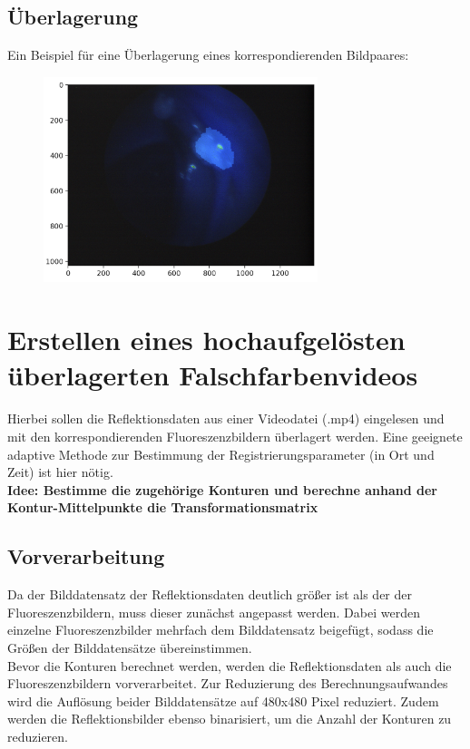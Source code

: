 \documentclass[conference]{IEEEtran}
\begin{document}
\subsection{Überlagerung}

Ein Beispiel für eine Überlagerung eines korrespondierenden Bildpaares:

\begin{figure}[h]
\includegraphics[width=8cm]{Fig2}
\end{figure}

\section{Erstellen eines hochaufgelösten überlagerten Falschfarbenvideos} 

Hierbei sollen die Reflektionsdaten aus einer Videodatei (.mp4) eingelesen und mit den korrespondierenden Fluoreszenzbildern überlagert werden. Eine geeignete adaptive Methode zur Bestimmung der Registrierungsparameter (in Ort und Zeit) ist hier nötig. \\

\textbf{Idee: Bestimme die zugehörige Konturen und berechne anhand der Kontur-Mittelpunkte die Transformationsmatrix} \\

\subsection{Vorverarbeitung}

Da der Bilddatensatz der Reflektionsdaten deutlich größer ist als der der Fluoreszenzbildern, muss dieser zunächst angepasst werden. Dabei werden einzelne Fluoreszenzbilder mehrfach dem Bilddatensatz beigefügt, sodass die Größen der Bilddatensätze übereinstimmen. \\

Bevor die Konturen berechnet werden, werden die Reflektionsdaten als auch die Fluoreszenzbildern vorverarbeitet. Zur Reduzierung des Berechnungsaufwandes wird die Auflösung beider Bilddatensätze auf 480x480 Pixel reduziert. Zudem werden die Reflektionsbilder ebenso binarisiert, um die Anzahl der Konturen zu reduzieren. 
\end{document}
